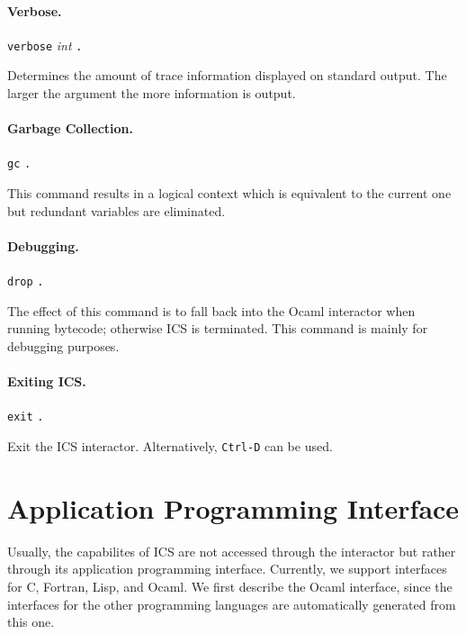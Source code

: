 \documentclass[12pt]{article}
\begin{document}
\paragraph{Verbose.}
  \begin{center}
  \texttt{verbose} \textit{int} \texttt{.}
  \end{center}
Determines the amount of trace information displayed on standard output.
The larger the argument the more information is output.

\paragraph{Garbage Collection.}
  \begin{center}
  \texttt{gc} \texttt{.}
  \end{center}
This command results in a logical context which is equivalent
to the current one but redundant variables are eliminated.

\paragraph{Debugging.}
  \begin{center}
  \texttt{drop} \texttt{.}
  \end{center}
The effect of this command is to fall back into the Ocaml
interactor when running bytecode; otherwise ICS is terminated.
This command is mainly for debugging purposes.

\paragraph{Exiting ICS.}
  \begin{center}
  \texttt{exit} \texttt{.}
  \end{center}
Exit the ICS interactor. Alternatively, \texttt{Ctrl-D} can
be used.


\section{Application Programming Interface}\label{sec:api}

Usually, the capabilites of ICS are not accessed through the interactor
but rather through its application programming interface.  Currently,
we support interfaces for C, Fortran, Lisp, and Ocaml.  We
first describe the Ocaml interface, since the interfaces for the
other programming languages are automatically generated from this one.
\end{document}
